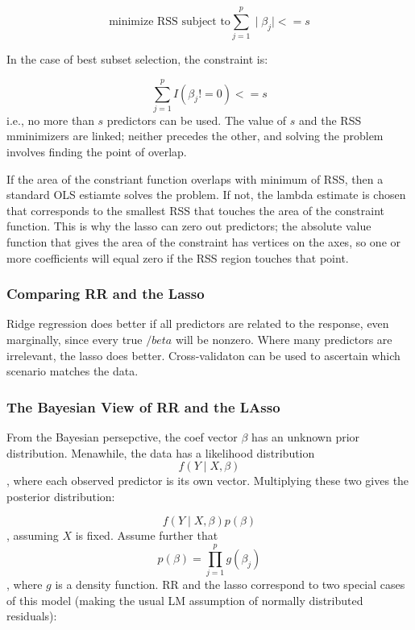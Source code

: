 \documentclass[
]{article}
\begin{document}
\[\text{minimize RSS subject to}\sum^p_{j=1}\mid\beta_j\mid <= s\]

In the case of best subset selection, the constraint is:

\[ \sum^p_{j=1}I(\beta_j !=0) <= s \] i.e., no more than \(s\)
predictors can be used. The value of \(s\) and the RSS mminimizers are
linked; neither precedes the other, and solving the problem involves
finding the point of overlap.

If the area of the constriant function overlaps with minimum of RSS,
then a standard OLS estiamte solves the problem. If not, the lambda
estimate is chosen that corresponds to the smallest RSS that touches the
area of the constraint function. This is why the lasso can zero out
predictors; the absolute value function that gives the area of the
constraint has vertices on the axes, so one or more coefficients will
equal zero if the RSS region touches that point.

\hypertarget{comparing-rr-and-the-lasso}{%
\subsubsection{Comparing RR and the
Lasso}\label{comparing-rr-and-the-lasso}}

Ridge regression does better if all predictors are related to the
response, even marginally, since every true \(/beta\) will be nonzero.
Where many predictors are irrelevant, the lasso does better.
Cross-validaton can be used to ascertain which scenario matches the
data.

\hypertarget{the-bayesian-view-of-rr-and-the-lasso}{%
\subsubsection{The Bayesian View of RR and the
LAsso}\label{the-bayesian-view-of-rr-and-the-lasso}}

From the Bayesian persepctive, the coef vector \(\beta\) has an unknown
prior distribution. Menawhile, the data has a likelihood distribution
\[f(Y\mid{X}, \beta)\], where each observed predictor is its own vector.
Multiplying these two gives the posterior distribution:

\[f(Y\mid{X}, \beta)p(\beta)\] , assuming \(X\) is fixed. Assume further
that \[p(\beta)=\prod^p_{j=1}g(\beta_j)\], where \(g\) is a density
function. RR and the lasso correspond to two special cases of this model
(making the usual LM assumption of normally distributed residuals):
\end{document}
